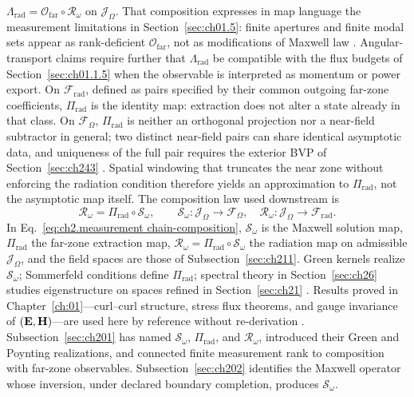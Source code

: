 \(\Lambda_{\mathrm{rad}}=\mathcal{O}_{\mathrm{far}}\circ\mathcal{R}_\omega\)
on \(\mathcal{J}_\Omega\). That composition expresses in map language
the measurement limitations in Section~\ref{sec:ch01.5}: finite apertures and
finite modal sets appear as rank-deficient \(\mathcal{O}_{\mathrm{far}}\), not
as modifications of Maxwell law \cite{stratton1941}. Angular-transport claims
require further that \(\Lambda_{\mathrm{rad}}\) be compatible with the flux
budgets of Section~\ref{sec:ch01.1.5} when the observable is interpreted as
momentum or power export.
On $\mathcal{F}_{\mathrm{rad}}$, defined as pairs specified by their common outgoing far-zone coefficients, $\Pi_{\mathrm{rad}}$ is the identity map: extraction does not alter a state already in that class. On $\mathcal{F}_\Omega$, $\Pi_{\mathrm{rad}}$ is neither an orthogonal projection nor a near-field subtractor in general; two distinct near-field pairs can share identical asymptotic data, and uniqueness of the full pair requires the exterior BVP of Section~\ref{sec:ch243} \cite{stratton1941,sommerfeld1949}. Spatial windowing that truncates the near zone without enforcing the radiation condition therefore yields an approximation to $\Pi_{\mathrm{rad}}$, not the asymptotic map itself.
The composition law used downstream is
\begin{equation}
\label{eq:ch2.measurement chain-composition}
\mathcal{R}_\omega
=
\Pi_{\mathrm{rad}}\circ\mathcal{S}_\omega,
\qquad
\mathcal{S}_\omega:\mathcal{J}_\Omega\to\mathcal{F}_\Omega,
\quad
\mathcal{R}_\omega:\mathcal{J}_\Omega\to\mathcal{F}_{\mathrm{rad}}.
\end{equation}
In Eq.~\eqref{eq:ch2.measurement chain-composition},
$\mathcal{S}_\omega$ is the Maxwell solution map, $\Pi_{\mathrm{rad}}$ the far-zone extraction map,
$\mathcal{R}_\omega=\Pi_{\mathrm{rad}}\circ\mathcal{S}_\omega$ the radiation map on admissible $\mathcal{J}_\Omega$, and the field spaces are those of Subsection~\ref{sec:ch211}.
Green kernels realize \(\mathcal{S}_\omega\); Sommerfeld conditions define
\(\Pi_{\mathrm{rad}}\); spectral theory in Section~\ref{sec:ch26} studies
eigenstructure on spaces refined in Section~\ref{sec:ch21}
\cite{harrington2001}. Results proved in Chapter~\ref{ch:01}---curl--curl structure, stress flux theorems, and
gauge invariance of $(\mathbf{E},\mathbf{H})$---are used here by reference without re-derivation
\cite{stratton1941}.
Subsection~\ref{sec:ch201} has named \(\mathcal{S}_\omega\), \(\Pi_{\mathrm{rad}}\), and
\(\mathcal{R}_\omega\), introduced their Green and Poynting realizations, and connected
finite measurement rank to composition with far-zone observables. Subsection~\ref{sec:ch202}
identifies the Maxwell operator whose inversion, under declared boundary completion,
produces \(\mathcal{S}_\omega\).
